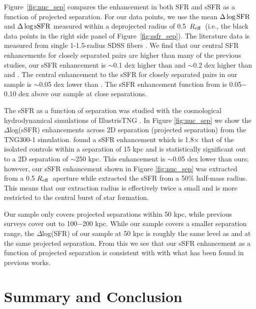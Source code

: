 \documentclass[iop,revtex4,twocolumn,apj,numberedappendix,appendixfloats]{emulateapj}
\newcommand{\reff}{$R_{\rm eff}$}
\begin{document}
Figure~\ref{fig:nuc_sep} compares the enhancement in both SFR and sSFR as a function of projected separation. For our data points, we use the mean $\Delta\log{\rm SFR}$ and $\Delta\log{\rm sSFR}$ measured within a deprojected radius of 0.5~\reff\ (i.e., the black data points in the right side panel of Figure~\ref{fig:ssfr_sep}). The literature data is measured from single 1-1.5\arcsec-radius SDSS fibers \citep{Ellison:2008,Scudder:2012,Patton:2013,Bustamante:2020}. We find that our central SFR enhancements for closely separated pairs are higher than many of the previous studies, our sSFR enhancement is $\sim$0.1 dex higher than \citet{Scudder:2012} and $\sim$0.2 dex higher than \citet{Ellison:2008} and \citet{Bustamante:2020}. The central enhancement to the sSFR for closely separated pairs in our sample is $\sim$0.05 dex lower than \citet{Patton:2013}. The sSFR enhancement function from \citet{Li:2008} is 0.05$-$0.10 dex above our sample at close separations.   

The sSFR as a function of separation was studied with the cosmological hydrodynamical simulations of IllustrisTNG \citep{Patton:2020}. In Figure \ref{fig:nuc_sep} we show the $\Delta$log(sSFR) enhancements across 2D separation (projected separation) from the TNG300-1 simulation. \citet{Patton:2020} found a sSFR enhancement which is 1.8$\times$ that of the isolated controls within a separation of 15 kpc and is statistically significant out to a 2D separation of $\sim$250 kpc. This enhancement is $\sim$0.05 dex lower than ours; however, our sSFR enhancement shown in Figure \ref{fig:nuc_sep} was extracted from a 0.5 \reff\ aperture while \citet{Patton:2020} extracted the sSFR from a 50\% half-mass radius. This means that our extraction radius is effectively twice a small and is more restricted to the central burst of star formation. 

Our sample only covers projected separations within 50 kpc, while previous surveys cover out to 100$-$200 kpc. While our sample covers a smaller separation range, the $\Delta$log(SFR) of our sample at 50 kpc is roughly the same level as \citet{Ellison:2008} and \citet{Bustamante:2020} at the same projected separation. From this we see that our sSFR enhancement as a function of projected separation is consistent with with what has been found in previous works. 

\section{Summary and Conclusion}\label{sec:sum}
\end{document}
